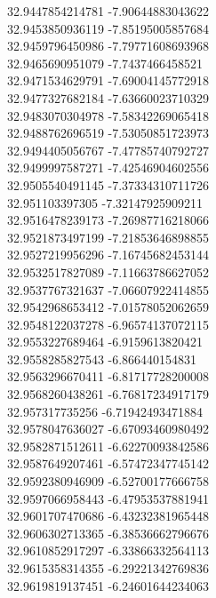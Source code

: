 {32.9447854214781	-7.90644883043622\\
32.9453850936119	-7.85195005857684\\
32.9459796450986	-7.79771608693968\\
32.9465690951079	-7.7437466458521\\
32.9471534629791	-7.69004145772918\\
32.9477327682184	-7.63660023710329\\
32.9483070304978	-7.58342269065418\\
32.9488762696519	-7.53050851723973\\
32.9494405056767	-7.47785740792727\\
32.9499997587271	-7.42546904602556\\
32.9505540491145	-7.37334310711726\\
32.951103397305	-7.32147925909211\\
32.9516478239173	-7.26987716218066\\
32.9521873497199	-7.21853646898855\\
32.9527219956296	-7.16745682453144\\
32.9532517827089	-7.11663786627052\\
32.9537767321637	-7.06607922414855\\
32.9542968653412	-7.01578052062659\\
32.9548122037278	-6.96574137072115\\
32.9553227689464	-6.9159613820421\\
32.9558285827543	-6.866440154831\\
32.9563296670411	-6.81717728200008\\
32.9568260438261	-6.76817234917179\\
32.957317735256	-6.71942493471884\\
32.9578047636027	-6.67093460980492\\
32.9582871512611	-6.62270093842586\\
32.9587649207461	-6.57472347745142\\
32.9592380946909	-6.52700177666758\\
32.9597066958443	-6.47953537881941\\
32.9601707470686	-6.43232381965448\\
32.9606302713365	-6.38536662796676\\
32.9610852917297	-6.33866332564113\\
32.9615358314355	-6.29221342769836\\
32.9619819137451	-6.24601644234063\\
}
